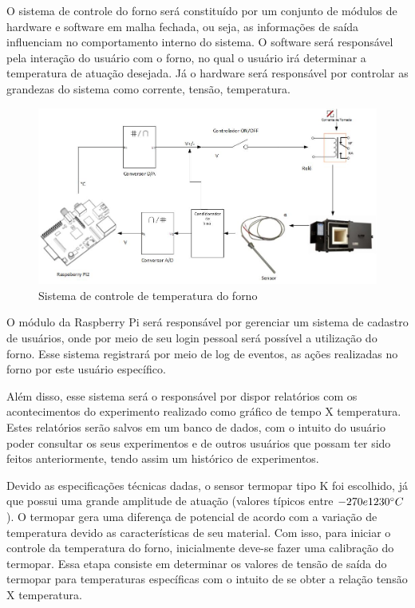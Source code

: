 O sistema de controle do forno será constituído por um conjunto de módulos de hardware e software em malha fechada, ou seja, as informações de saída influenciam no comportamento interno do sistema. O software será responsável pela interação do usuário com o forno, no qual o usuário irá determinar a temperatura de atuação desejada. Já o hardware será responsável por controlar as grandezas do sistema como corrente, tensão, temperatura.

\begin{figure}[h]
	\centering
	\label{diagrama}
	\includegraphics[keepaspectratio=true,scale=0.5]{figuras/diagrama.jpg}
	\caption{Sistema de controle de temperatura do forno}
\end{figure}

O módulo da Raspberry Pi será responsável por gerenciar um sistema de cadastro de usuários, onde por meio de seu login pessoal será possível a utilização do forno. Esse sistema registrará por meio de log de eventos, as ações realizadas no forno por este usuário específico.

Além disso, esse sistema será o responsável por dispor relatórios com os acontecimentos do experimento realizado como gráfico de tempo X temperatura. Estes relatórios serão salvos em um banco de dados, com o intuito do usuário poder consultar os seus experimentos e de outros usuários que possam ter sido feitos anteriormente, tendo assim um histórico de experimentos.

Devido as especificações técnicas dadas, o sensor termopar tipo K foi escolhido, já que possui uma grande amplitude de atuação (valores típicos entre $-270 e 1230 \degree C$). O termopar gera uma diferença de potencial de acordo com a variação de temperatura devido as características de seu material. Com isso, para iniciar o controle da temperatura do forno, inicialmente deve-se fazer uma calibração do termopar. Essa etapa consiste em determinar os valores de tensão de saída do termopar para temperaturas específicas com o intuito de se obter a relação tensão X temperatura.

